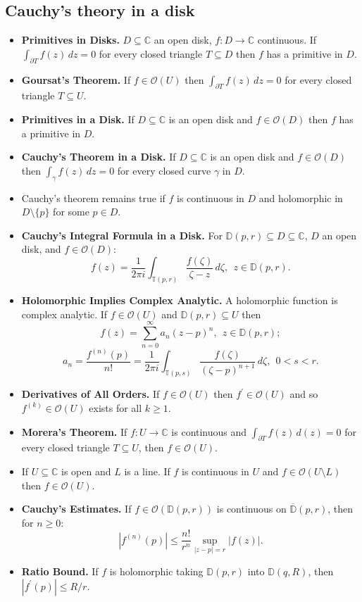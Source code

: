 \documentclass{article}
\newenvironment{topic}[1]{%
{\subsection{#1}}%
\begin{itemize}%
}{%
\end{itemize}%
}
\newcommand{\theorem}[1]{\item {\bf #1.}}
\newcommand{\corollary}[1]{\item {\bf #1.}}
\newcommand{\holo}[1]{\mathcal{O}(#1)}
\newcommand{\remark}{\item}
\newcommand{\disk}[2]{\mathbb{D}(#1, #2)}
\newcommand{\cdisk}[2]{\overline{\mathbb{D}}(#1, #2)}
\newcommand{\sphere}[2]{\mathbb{T}{(#1, #2)}}
\begin{document}
\begin{topic}{Cauchy's theory in a disk}

\theorem{Primitives in Disks} $D \subseteq \mathbb{C}$ an open disk, $f : D \to \mathbb{C}$ continuous. If $\int_{\partial T} f(z)\,dz = 0$ for every closed triangle $T \subseteq D$ then $f$ has a primitive in $D$.

\theorem{Goursat's Theorem} If $f \in \holo{U}$ then $\int_{\partial T} f(z)\,dz = 0$ for every closed triangle $T \subseteq U$.

\theorem{Primitives in a Disk} If $D \subseteq \mathbb{C}$ is an open disk and $f \in \holo{D}$ then $f$ has a primitive in $D$.

\theorem{Cauchy's Theorem in a Disk} If $D \subseteq \mathbb{C}$ is an open disk and $f \in \holo{D}$ then $\int_\gamma f(z)\,dz = 0$ for every closed curve $\gamma$ in $D$.

\remark Cauchy's theorem remains true if $f$ is continuous in $D$ and holomorphic in $D \setminus \{p\}$ for some $p \in D$.

\theorem{Cauchy's Integral Formula in a Disk} For $\disk{p}{r} \subseteq D \subseteq \mathbb{C}$, $D$ an open disk, and $f \in \holo{D}$: $$f(z) = \dfrac{1}{2\pi i}\int_{\sphere{p}{r}} \dfrac{f(\zeta)}{\zeta - z}\, d\zeta,~~z \in \disk{p}{r}.$$

\theorem{Holomorphic Implies Complex Analytic} A holomorphic function is complex analytic. If $f \in \holo{U}$ and $\disk{p}{r} \subseteq U$ then $$f(z) = \sum_{n=0}^\infty a_n (z - p)^n,~~z \in \disk{p}{r};$$ $$a_n = \dfrac{f^{(n)}(p)}{n!} = \dfrac{1}{2\pi i}\int_{\sphere{p}{s}} \dfrac{f(\zeta)}{(\zeta - p)^{n+1}}\,d\zeta,~~0 < s < r.$$

\corollary{Derivatives of All Orders} If $f \in \holo{U}$ then $f^\prime \in \holo{U}$ and so $f^{(k)} \in \holo{U}$ exists for all $k \geq 1$.

\theorem{Morera's Theorem} If $f : U \to \mathbb{C}$ is continuous and $\int_{\partial T} f(z)\,d(z) = 0$ for every closed triangle $T \subseteq U$, then $f \in \holo{U}$.

\remark If $U \subseteq \mathbb{C}$ is open and $L$ is a line. If $f$ is continuous in $U$ and $f \in \holo{U \setminus L}$ then $f \in \holo{U}$.

\theorem{Cauchy's Estimates} If $f \in \holo{\disk{p}{r}}$ is continuous on $\cdisk{p}{r}$, then for $n \geq 0$: $$\left|f^{(n)}(p)\right| \leq \dfrac{n!}{r^n} \sup_{|z - p| = r} |f(z)|.$$

\theorem{Ratio Bound} If $f$ is holomorphic taking $\disk{p}{r}$ into $\disk{q}{R}$, then $|f^\prime(p)| \leq R/r$.


\end{topic}
\end{document}
